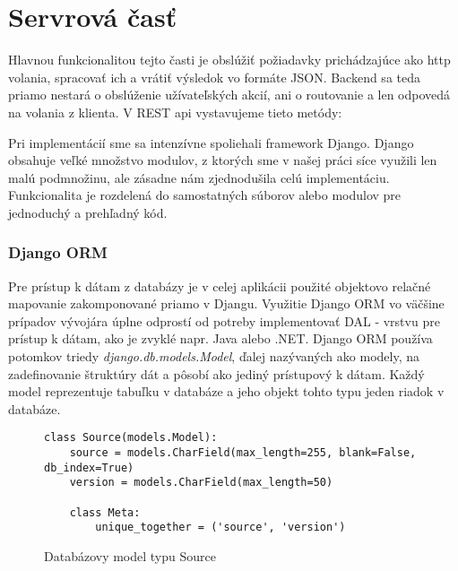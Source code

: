 \chapter{Servrová časť}
Hlavnou funkcionalitou tejto časti je obslúžiť požiadavky prichádzajúce ako http volania, spracovať ich a vrátiť výsledok vo formáte JSON. Backend sa teda priamo nestará o obslúženie užívateľských akcií, ani o routovanie a len odpovedá na volania z klienta. V REST api vystavujeme tieto metódy:

 \begin{minipage}{0.9\linewidth}
 	\centering
 \end{minipage}
 
 
Pri implementácií sme sa intenzívne spoliehali framework Django. Django obsahuje veľké množstvo modulov, z ktorých sme v našej práci síce využili len malú podmnožinu, ale zásadne nám zjednodušila celú implementáciu. Funkcionalita je rozdelená do samostatných súborov alebo modulov pre jednoduchý a prehľadný kód.

\subsection{Django ORM}
Pre prístup k dátam z databázy je v celej aplikácii použité objektovo relačné mapovanie zakomponované priamo v Djangu. Využitie Django ORM vo väčšine prípadov vývojára úplne odprostí od potreby implementovať DAL - vrstvu pre prístup k dátam, ako je zvyklé napr. Java alebo .NET. Django ORM používa potomkov triedy \emph{django.db.models.Model}, ďalej nazývaných ako modely, na zadefinovanie štruktúry dát a pôsobí ako jediný prístupový k dátam. Každý model reprezentuje tabuľku v databáze a jeho objekt tohto typu jeden riadok v databáze. 

\begin{figure}[htbp]
\centering
\begin{minipage}{0.9\textwidth}
\lstset{tabsize=4,columns=flexible,breaklines=true,breakatwhitespace=true, showstringspaces=false}
\begin{lstlisting}
class Source(models.Model):
    source = models.CharField(max_length=255, blank=False, db_index=True)
    version = models.CharField(max_length=50)

    class Meta:
        unique_together = ('source', 'version')
\end{lstlisting} 		
\end{minipage} 
\caption{Databázovy model typu Source}
\label{fig:static-analysis}
\end{figure}

